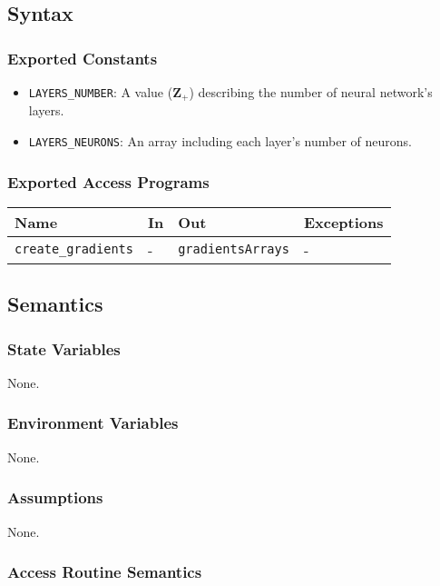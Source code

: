 \documentclass[12pt, titlepage]{article}
\def\code#1{\texttt{#1}}
\begin{document}
\subsection{Syntax}
\subsubsection{Exported Constants}
\begin{itemize}
  \item \code{LAYERS\_NUMBER}: A value ($\mathbf{Z}_{+}$) describing the number of 
  neural network's layers.
  \item \code{LAYERS\_NEURONS}: An array including each layer's number of neurons.
\end{itemize}

\subsubsection{Exported Access Programs}

\begin{center}
\begin{tabular}{p{3.5cm} p{4cm} p{4cm} p{3.5cm}}
\hline
\textbf{Name} & \textbf{In} & \textbf{Out} & \textbf{Exceptions} \\
\hline
\code{create\_gradients} & - & \code{gradientsArrays} & - \\
\hline
\end{tabular}
\end{center}

\subsection{Semantics}

\subsubsection{State Variables}
None.

\subsubsection{Environment Variables}
None.

\subsubsection{Assumptions}
None.

\subsubsection{Access Routine Semantics}
\end{document}
